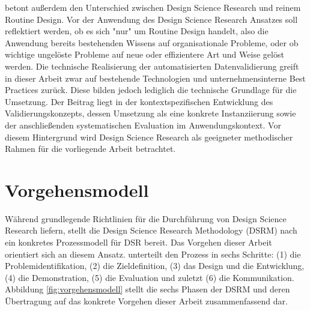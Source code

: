 \documentclass[../main.tex]{subfiles}
\begin{document}
\textcite{hevnerDsr} betont außerdem den Unterschied zwischen Design Science Research und reinem Routine Design. Vor der Anwendung des Design Science Research Ansatzes soll reflektiert werden, ob es sich "nur" um Routine Design handelt, also die Anwendung bereits bestehenden Wissens auf organisationale Probleme, oder ob wichtige ungelöste Probleme auf neue oder effizientere Art und Weise gelöst werden. Die technische Realisierung der automatisierten Datenvalidierung greift in dieser Arbeit zwar auf bestehende Technologien und unternehmensinterne Best Practices zurück. Diese bilden jedoch lediglich die technische Grundlage für die Umsetzung. Der Beitrag liegt in der kontextspezifischen Entwicklung des Validierungskonzepts, dessen Umsetzung als eine konkrete Instanziierung sowie der anschließenden systematischen Evaluation im Anwendungskontext. Vor diesem Hintergrund wird Design Science Research als geeigneter methodischer Rahmen für die vorliegende Arbeit betrachtet.

\section{Vorgehensmodell}

Während \textcite{hevnerDsr} grundlegende Richtlinien für die Durchführung von Design Science Research liefern, stellt die Design Science Research Methodology (DSRM) nach \textcite{peffersDesignScienceResearch2008} ein konkretes Prozessmodell für DSR bereit. Das Vorgehen dieser Arbeit orientiert sich an diesem Ansatz.
\textcite{peffersDesignScienceResearch2008} unterteilt den Prozess in sechs Schritte: (1) die Problemidentifikation, (2) die Zieldefinition, (3) das Design und die Entwicklung, (4) die Demonstration, (5) die Evaluation und zuletzt (6) die Kommunikation. Abbildung \ref{fig:vorgehensmodell} stellt die sechs Phasen der DSRM und deren Übertragung auf das konkrete Vorgehen dieser Arbeit zusammenfassend dar.
\end{document}
